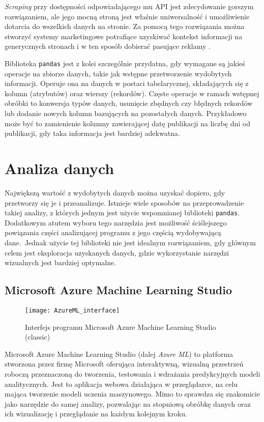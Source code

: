 \emph{Scraping} przy dostępności odpowiadającego mu API jest zdecydowanie gorszym rozwiązaniem, ale jego mocną stroną jest właśnie uniwersalność i umożliwienie dotarcia do wszelkich danych na stronie.
Za pomocą tego rozwiązania można stworzyć systemy marketingowe potrafiące uzyskiwać kontekst informacji na generycznych stronach i w ten sposób dobierać pasujące reklamy \cite{vargiu2013exploiting}.

Biblioteka \texttt{pandas} jest z kolei szczególnie przydatna, gdy wymagane są jakieś operacje na zbiorze danych, takie jak wstępne przetworzenie wydobytych informacji.
Operuje ona na danych w postaci tabelarycznej, składających się z kolumn (atrybutów) oraz wierszy (rekordów).
Częste operacje w ramach wstępnej obróbki to konwersja typów danych, usunięcie zbędnych czy błędnych rekordów lub dodanie nowych kolumn bazujących na pozostałych danych.
Przykładowo może być to zamienienie kolumny zawierającej datę publikacji na liczbę dni od publikacji, gdy taka informacja jest bardziej adekwatna.

\section{Analiza danych}

Największą wartość z wydobytych danych można uzyskać dopiero, gdy przetworzy się je i przeanalizuje.
Istnieje wiele sposobów na przeprowadzenie takiej analizy, z których jednym jest użycie wspomnianej biblioteki \texttt{pandas}.
Dodatkowym atutem wyboru tego narzędzia jest możliwość ściślejszego powiązania części analizującej programu z jego częścią wydobywającą dane.\
Jednak użycie tej biblioteki nie jest idealnym rozwiązaniem, gdy głównym celem jest eksploracja uzyskanych danych, gdzie wykorzystanie narzędzi wizualnych jest bardziej optymalne.

\subsection{Microsoft Azure Machine Learning Studio}

\begin{figure}[ht]
	\texttt{[image: AzureML\_interface]}
	\caption{Interfejs programu Microsoft Azure Machine Learning Studio (classic)}
\end{figure}

Microsoft Azure Machine Learning Studio (dalej \emph{Azure ML}) to platforma stworzona przez firmę Microsoft oferująca interaktywną, wizualną przestrzeń roboczą przeznaczoną do tworzenia, testowania i wdrażania predykcyjnych modeli analitycznych.
Jest to aplikacja webowa działająca w przeglądarce, na celu mająca tworzenie modeli uczenia maszynowego.
Mimo to sprawdza się znakomicie jako narzędzie do samej analizy, pozwalając na stopniową obróbkę danych oraz ich wizualizację i przeglądanie na każdym kolejnym kroku.

